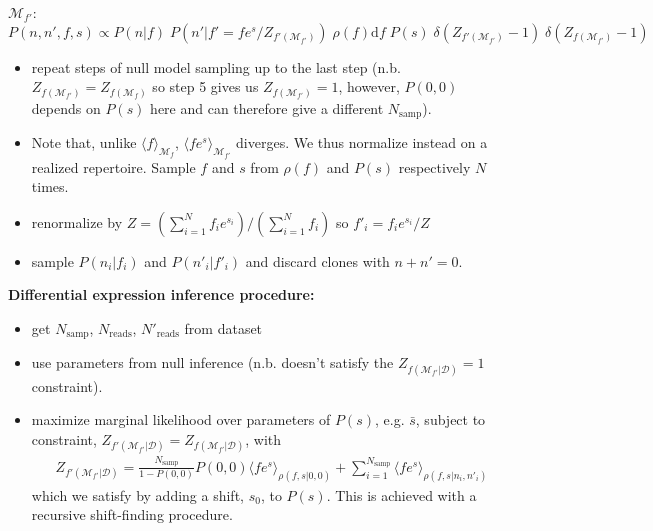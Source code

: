 \documentclass[letterpaper,english,prl,reprint,onecolumn,longbibliography]{revtex4-1} %
\begin{document}
$\mathcal{M}_{f'}$: $P(n,n',f,s)\propto P(n|f)\;P(n'|f'=fe^s/Z_{f'(\mathcal{M}_{f'})})\;\rho(f)\textrm{d}f\;P(s)\;\delta(Z_{f'(\mathcal{M}_{f'})}-1)\;\delta(Z_{f(\mathcal{M}_{f'})}-1)\;$
\begin{itemize}
	\item  repeat steps of null model sampling up to the last step (n.b. $Z_{f(\mathcal{M}_{f'})}=Z_{f(\mathcal{M}_{f})}$ so step 5 gives us $Z_{f(\mathcal{M}_{f'})}=1$, however, $P(0,0)$ depends on $P(s)$ here and can therefore give a different $N_\textrm{samp}$).
	\item  Note that, unlike $\langle f \rangle_{\mathcal{M}_{f}} $, $\langle fe^s \rangle_{\mathcal{M}_{f'}} $ diverges. We thus normalize instead on a realized repertoire. Sample $f$ and $s$ from $\rho(f)$ and $P(s)$ respectively $N$ times.
	\item  renormalize by $Z=\left(\sum_{i=1}^N f_i e^{s_i}\right)\bigg/\left(\sum_{i=1}^N f_i \right)$ so $f'_i=f_ie^{s_i}/Z$
	\item  sample $P(n_i|f_i)$ and $P(n'_i|f'_i)$ and discard clones with $n+n'=0$. 
\end{itemize}
\textbf{Differential expression inference procedure:}
\begin{itemize}
	\item  get $N_\textrm{samp}$, $N_{\textrm{reads}}$, $N'_{\textrm{reads}}$ from dataset
	\item  use parameters from null inference (n.b. doesn't satisfy the $Z_{f(\mathcal{M}_{f'}|\mathcal{D})}=1$ constraint).
	\item  maximize marginal likelihood over parameters of $P(s)$, e.g. $\bar{s}$, subject to constraint, $Z_{f'(\mathcal{M}_{f'}|\mathcal{D})}=Z_{f(\mathcal{M}_{f'}|\mathcal{D})}$, with
	\begin{eqnarray}
		Z_{f'(\mathcal{M}_{f'}|\mathcal{D})}=\frac{N_{\textrm{samp}}}{1-P(0,0)} P(0,0)\langle fe^s\rangle_{\rho(f,s|0,0)}+\sum_{i=1}^{N_{\textrm{samp}}}\langle fe^s\rangle_{\rho(f,s|n_i,n'_i)}
	\end{eqnarray}
	which we satisfy by adding a shift, $s_0$, to $P(s)$. This is achieved with a recursive shift-finding procedure.
\end{itemize}
\end{document}
